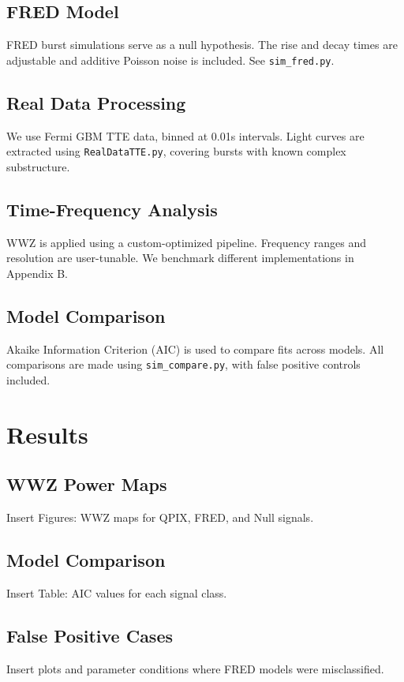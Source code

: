 \documentclass[11pt]{article}
\begin{document}
\subsection{FRED Model}
FRED burst simulations serve as a null hypothesis. The rise and decay times are adjustable and additive Poisson noise is included. See \texttt{sim\_fred.py}.

\subsection{Real Data Processing}
We use Fermi GBM TTE data, binned at 0.01s intervals. Light curves are extracted using \texttt{RealDataTTE.py}, covering bursts with known complex substructure.

\subsection{Time-Frequency Analysis}
WWZ is applied using a custom-optimized pipeline. Frequency ranges and resolution are user-tunable. We benchmark different implementations in Appendix B.

\subsection{Model Comparison}
Akaike Information Criterion (AIC) is used to compare fits across models. All comparisons are made using \texttt{sim\_compare.py}, with false positive controls included.

\section{Results}
\subsection{WWZ Power Maps}
Insert Figures: WWZ maps for QPIX, FRED, and Null signals.

\subsection{Model Comparison}
Insert Table: AIC values for each signal class.

\subsection{False Positive Cases}
Insert plots and parameter conditions where FRED models were misclassified.
\end{document}

